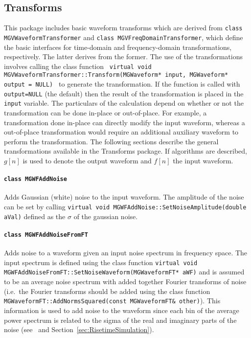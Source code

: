 		\subsection{Transforms}
		\label{sec:MGDOTransforms}
		
	This package includes basic waveform transforms which are derived from \lstinline!class MGVWaveformTransformer!  and \lstinline!class MGVFreqDomainTransformer!, which define the basic interfaces for time-domain and  frequency-domain transformations, respectively.  The latter derives from the former.  The use of the transformations involves calling the class function
\lstinline! virtual void MGVWaveformTransformer::Transform(MGWaveform* input, MGWaveform* output = NULL) ! to generate the transformation.  If the function is called with \lstinline!output=NULL! (the default) then the result of the transformation is placed in the \lstinline!input! variable.  The particulars of the calculation depend on whether or not the transformation can be done in-place or out-of-place.  For example, a transformation done in-place can directly modify the input waveform, whereas a out-of-place transformation would require an additional auxiliary waveform to perform the transformation.  The following sections describe the general transformations available in the Transforms package.  If algorithms are described, $g[n]$ is used to denote the output waveform and $f[n]$ the input waveform.
	
	
			\paragraph{\lstinline!class MGWFAddNoise!} 
	Adds Gaussian (white) noise to the input waveform.  The amplitude of the noise can be set by calling \lstinline!virtual void MGWFAddNoise::SetNoiseAmplitude(double aVal)! defined as the $\sigma$ of the gaussian noise.  
			
			\paragraph{\lstinline!class MGWFAddNoiseFromFT!} 

Adds noise to a waveform given an input noise spectrum in frequency space.  The input spectrum is defined using the class function \lstinline!virtual void MGWFAddNoiseFromFT::SetNoiseWaveform(MGWaveformFT* aWF)! and is assumed
to be an average noise spectrum with added together Fourier transforms of noise (i.e.~the Fourier transforms should be added using the class function \lstinline!MGWaveformFT::AddNormsSquared(const MGWaveformFT& other)!).  This information is used to add noise to the waveform since each bin of the average power spectrum is related to the sigma of the real and imaginary
parts of the noise (see~\cite{WanThesis08} and Section~\ref{sec:RisetimeSimulation}).  

